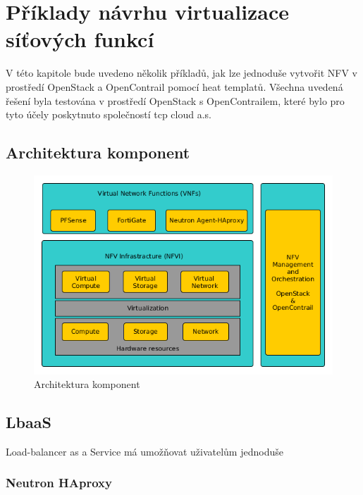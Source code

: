 \chapter{Příklady návrhu virtualizace síťových funkcí}

V této kapitole bude uvedeno několik příkladů, jak lze jednoduše vytvořit NFV v prostředí OpenStack a OpenContrail pomocí heat templatů. Všechna uvedená řešení byla testována v prostředí OpenStack s OpenContrailem, které bylo pro tyto účely poskytnuto společností tcp cloud a.s. 


\section{Architektura komponent}\label{sub:interaction}

\begin{figure}[h]
\begin{centering}
\includegraphics[scale=0.51]{images/VNF_overview}
\par\end{centering}
\caption{Architektura komponent\label{fig:VNF_overview}}
\end{figure}


\section{LbaaS}\label{sub:interaction}

Load-balancer as a Service má umožňovat uživatelům jednoduše 

\subsection{Neutron HAproxy}\label{sub:interaction}

